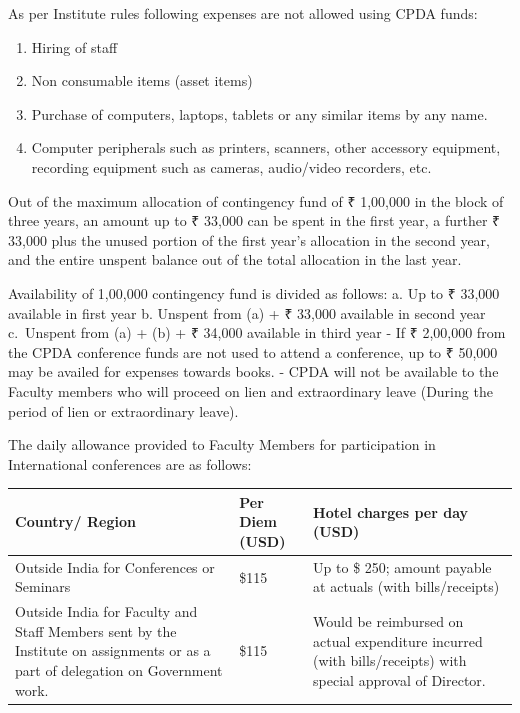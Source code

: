 \documentclass[
  10pt,
  a5paper,
  10pt,
  openany]{amsbook}
\providecommand{\tightlist}{%
  \setlength{\itemsep}{0pt}\setlength{\parskip}{0pt}}
\begin{document}
As per Institute rules following expenses are not allowed using CPDA
funds:

\begin{enumerate}
\def\labelenumi{\arabic{enumi}.}
\tightlist
\item
  Hiring of staff
\item
  Non consumable items (asset items)
\item
  Purchase of computers, laptops, tablets or any similar items by any
  name.
\item
  Computer peripherals such as printers, scanners, other accessory
  equipment, recording equipment such as cameras, audio/video recorders,
  etc.
\end{enumerate}

Out of the maximum allocation of contingency fund of ₹ 1,00,000 in the
block of three years, an amount up to ₹ 33,000 can be spent in the first
year, a further ₹ 33,000 plus the unused portion of the first year's
allocation in the second year, and the entire unspent balance out of the
total allocation in the last year.

Availability of 1,00,000 contingency fund is divided as follows: a. Up
to ₹ 33,000 available in first year b. Unspent from (a) + ₹ 33,000
available in second year c.~Unspent from (a) + (b) + ₹ 34,000 available
in third year - If ₹ 2,00,000 from the CPDA conference funds are not
used to attend a conference, up to ₹ 50,000 may be availed for expenses
towards books. - CPDA will not be available to the Faculty members who
will proceed on lien and extraordinary leave (During the period of lien
or extraordinary leave).

The daily allowance provided to Faculty Members for participation in
International conferences are as follows:

\begin{longtable}[]{@{}
  >{\raggedright\arraybackslash}p{}
  >{\raggedright\arraybackslash}p{}
  >{\raggedright\arraybackslash}p{}@{}}
\toprule\noalign{}
\begin{minipage}[b]{\linewidth}\raggedright
Country/ Region
\end{minipage} & \begin{minipage}[b]{\linewidth}\raggedright
Per Diem (USD)
\end{minipage} & \begin{minipage}[b]{\linewidth}\raggedright
Hotel charges per day (USD)
\end{minipage} \\
\midrule\noalign{}
\endhead
\bottomrule\noalign{}
\endlastfoot
Outside India for Conferences or Seminars & \$115 & Up to \$ 250; amount
payable at actuals (with bills/receipts) \\
Outside India for Faculty and Staff Members sent by the Institute on
assignments or as a part of delegation on Government work. & \$115 &
Would be reimbursed on actual expenditure incurred (with bills/receipts)
with special approval of Director. \\
\end{longtable}
\end{document}

